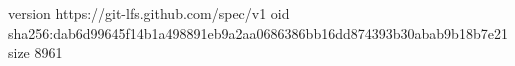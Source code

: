 version https://git-lfs.github.com/spec/v1
oid sha256:dab6d99645f14b1a498891eb9a2aa0686386bb16dd874393b30abab9b18b7e21
size 8961
